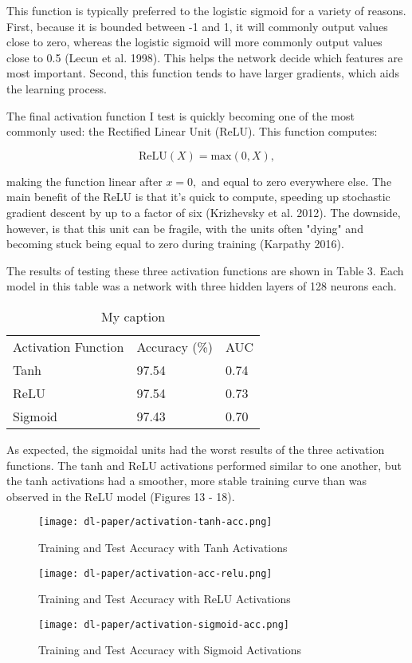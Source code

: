\documentclass[12pt]{article}  %
\theoremstyle{definition}
\theoremstyle{remark}
\begin{document}
\par This function is typically preferred to the  logistic sigmoid for a variety of reasons. First, because it is bounded between -1 and 1,  it will commonly output values close to zero, whereas the logistic sigmoid will more commonly output values close to 0.5 (Lecun et al. 1998). This helps the network decide which features are most important. Second,  this function tends to have larger gradients, which aids the learning process. 
\par The final activation function I test is quickly becoming one of the most commonly used: the Rectified Linear Unit (ReLU). This function computes:

$$ \text{ReLU}(X) = \text{max}(0,X), $$

making the function linear after $x=0,$ and equal to zero everywhere else. The main benefit of the ReLU is that it's quick to compute, speeding up stochastic gradient descent by up to a factor of six (Krizhevsky et al. 2012). The downside, however, is that this unit can be fragile, with the units often "dying" and becoming stuck being equal to zero during training (Karpathy 2016).

\par The results of testing these three activation functions are shown in Table 3. Each model in this table was a network with three hidden layers of 128 neurons each. 

\begin{table}[]
\centering
\caption{My caption}
\label{my-label}
\begin{tabular}{lll}
Activation Function & Accuracy (\%) & AUC  \\
Tanh                & 97.54         & 0.74 \\
ReLU                & 97.54         & 0.73 \\
Sigmoid             & 97.43         & 0.70
\end{tabular}
\end{table}

\par As expected, the sigmoidal units had the worst results of the three activation functions. The tanh and ReLU activations performed similar to one another, but the tanh activations had a smoother, more stable training curve than was observed in the ReLU model (Figures 13 - 18). 

\begin{figure}[!htb]
  \texttt{[image: dl-paper/activation-tanh-acc.png]}
  \caption{Training and Test Accuracy with Tanh Activations}\label{tanh-acc}
\endminipage\hfill
{}
  \texttt{[image: dl-paper/activation-acc-relu.png]}
  \caption{Training and Test Accuracy with ReLU Activations}\label{relu-acc}
\endminipage\hfill
{}%
  \texttt{[image: dl-paper/activation-sigmoid-acc.png]}
  \caption{Training and Test Accuracy with Sigmoid Activations}\label{sigmoid-acc}
\endminipage
\end{figure}
\end{document}
